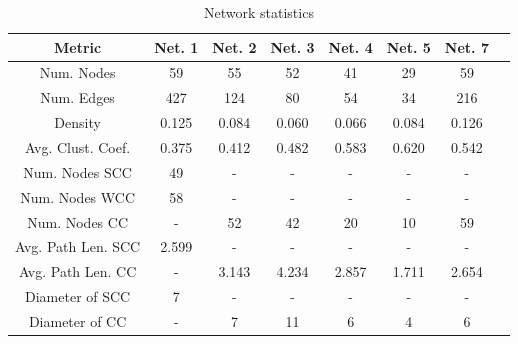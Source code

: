 \begin{table}
    \centering
    \begin{tabular}{|c|c|c|c|c|c|c|c|}
        \hline
        \textbf{Metric} & \textbf{Net. 1} & \textbf{Net. 2} & \textbf{Net. 3} & \textbf{Net. 4} & \textbf{Net. 5} & \textbf{Net. 7} \\
        \hline
        Num. Nodes & 59 & 55 & 52 & 41 & 29 & 59 \\
        \hline
        Num. Edges & 427 & 124 & 80 & 54 & 34 & 216 \\
        \hline
        Density & 0.125 & 0.084 & 0.060 & 0.066 & 0.084 & 0.126 \\
        \hline
        Avg. Clust. Coef. & 0.375 & 0.412 & 0.482 & 0.583 & 0.620 & 0.542 \\
        \hline
        Num. Nodes SCC & 49 & - & - & - & - & - \\
        \hline
        Num. Nodes WCC & 58 & - & - & - & - & - \\
        \hline
        Num. Nodes CC & - & 52 & 42 & 20 & 10 & 59 \\
        \hline
        Avg. Path Len. SCC & 2.599 & - & - & - & - & - \\
        \hline
        Avg. Path Len. CC & - & 3.143 & 4.234 & 2.857 & 1.711 & 2.654 \\
        \hline
        Diameter of SCC & 7 & - & - & - & - & - \\
        \hline
        Diameter of CC & - & 7 & 11 & 6 & 4 & 6 \\
        \hline
    \end{tabular}
    \caption{Network statistics}
    \label{table:1}
\end{table}
